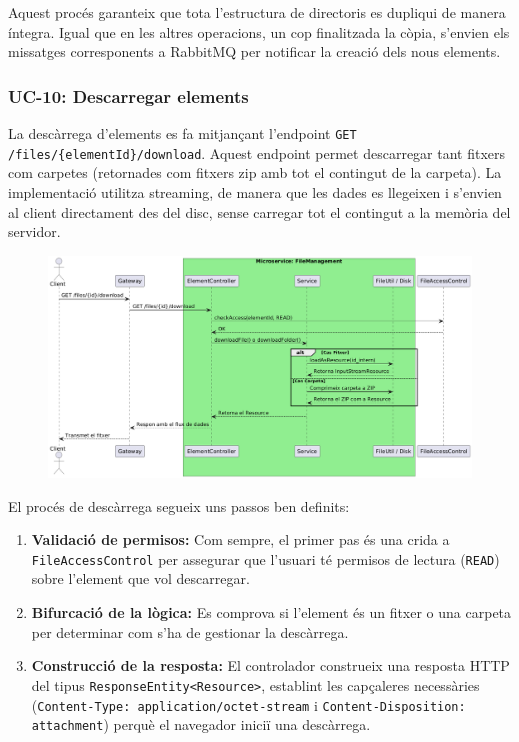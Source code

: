 Aquest procés garanteix que tota l'estructura de directoris es dupliqui de manera íntegra. Igual que en les altres operacions, un cop finalitzada la còpia, s'envien els missatges corresponents a RabbitMQ per notificar la creació dels nous elements.

\subsubsection{UC-10: Descarregar elements}

La descàrrega d'elements es fa mitjançant l'endpoint \texttt{GET /files/\{elementId\}/download}. Aquest endpoint permet descarregar tant fitxers com carpetes (retornades com fitxers zip amb tot el contingut de la carpeta). La implementació utilitza streaming, de manera que les dades es llegeixen i s'envien al client directament des del disc, sense carregar tot el contingut a la memòria del servidor.

\begin{figure}[H]
    \centering
    \includegraphics[width=\textwidth]{Figures/flux/download_files.png}
\end{figure}

El procés de descàrrega segueix uns passos ben definits:
\begin{enumerate}
    \item \textbf{Validació de permisos:} Com sempre, el primer pas és una crida a \texttt{FileAccessControl} per assegurar que l'usuari té permisos de lectura (\texttt{READ}) sobre l'element que vol descarregar.
    \item \textbf{Bifurcació de la lògica:} Es comprova si l'element és un fitxer o una carpeta per determinar com s'ha de gestionar la descàrrega.
    \item \textbf{Construcció de la resposta:} El controlador construeix una resposta HTTP del tipus \texttt{ResponseEntity<Resource>}, establint les capçaleres necessàries (\texttt{Content-Type: application/octet-stream} i \texttt{Content-Disposition: attachment}) perquè el navegador iniciï una descàrrega.
\end{enumerate}

